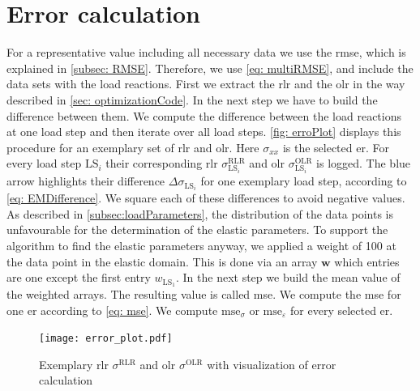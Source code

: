 \section{Error calculation}\label{sec: errorCalculation}
For a representative value including all necessary data we use the \acrshort{rmse}, which is explained in \autoref{subsec: RMSE}. Therefore, we use \autoref{eq: multiRMSE}, and include the data sets with the load reactions.
First we extract the \acrlong{rlr} and the \acrlong{olr} in the way described in \autoref{sec: optimizationCode}. In the next step we have to build the difference between them. We compute the difference between the load reactions at one load step and then iterate over all load steps. \autoref{fig: erroPlot} displays this procedure for an exemplary set of \acrlong{rlr} and \acrlong{olr}. Here $\sigma_{xx}$ is the selected \acrlong{er}. For every load step $\text{LS}_i$ their corresponding \acrfull{rlr} $\sigma_{\scriptscriptstyle\text{LS}_i}^{\scriptscriptstyle\text{RLR}}$ and \acrfull{olr} $\sigma_{\scriptscriptstyle\text{LS}_i}^{\scriptscriptstyle\text{OLR}}$ is logged. The blue arrow highlights their difference $\Delta\sigma_{\scriptscriptstyle\text{LS}_i}$ for one exemplary load step, according to \autoref{eq: EMDifference}. We square each of these differences to avoid negative values.  As described in \autoref{subsec:loadParameters}, the distribution of the data points is unfavourable for the determination of the elastic parameters. To support the algorithm to find the elastic parameters anyway, we applied a weight of 100 at the data point in the elastic domain. This is done via an array $\boldsymbol{w}$ which entries are one except the first entry $w_{\scriptscriptstyle\text{LS}_1}$. 
In the next step we build the mean value of the weighted arrays. The resulting value is called \acrfull{mse}. We compute the \acrshort{mse} for one \acrlong{er} according to \autoref{eq: mse}. We compute $\text{mse}_{\sigma}$ or $\text{mse}_{\varepsilon}$ for every selected \acrlong{er}. 

\begin{figure}[H]
    \centering
    \texttt{[image: error\_plot.pdf]}
    \caption{Exemplary \acrlong{rlr} $\sigma^{\scriptscriptstyle\text{RLR}}$ and \acrlong{olr} $\sigma^{\scriptscriptstyle\text{OLR}}$ with visualization of error calculation}
    \label{fig: erroPlot}
\end{figure}


